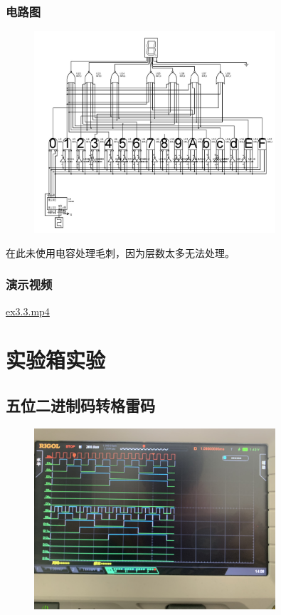 \documentclass[UTF8, a4paper, 11pt]{article}
\begin{document}
\subsubsection{电路图}
\begin{figure}[H]
    \centering
    \includegraphics[width=0.8\textwidth]{ex3.3.jpg}
\end{figure}
在此未使用电容处理毛刺，因为层数太多无法处理。
\subsubsection{演示视频}
\href{run:/Vids/ex3.3.mp4}{ex3.3.mp4}
\section{实验箱实验}
\subsection{五位二进制码转格雷码}
\begin{figure}[H]
    \centering
    \includegraphics[width=0.8\textwidth]{Q2G.JPG}
\end{figure}
\end{document}
